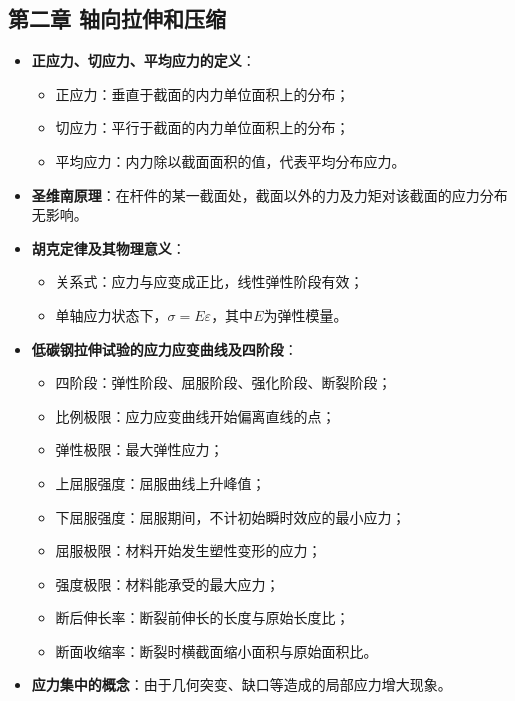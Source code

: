 \documentclass[12pt,a4paper]{article}
\begin{document}
\subsection*{第二章 轴向拉伸和压缩}
\begin{itemize}
  \item \textbf{正应力、切应力、平均应力的定义}：
    \begin{itemize}
      \item 正应力：垂直于截面的内力单位面积上的分布；
      \item 切应力：平行于截面的内力单位面积上的分布；
      \item 平均应力：内力除以截面面积的值，代表平均分布应力。
    \end{itemize}
  \item \textbf{圣维南原理}：在杆件的某一截面处，截面以外的力及力矩对该截面的应力分布无影响。
  \item \textbf{胡克定律及其物理意义}：
    \begin{itemize}
      \item 关系式：应力与应变成正比，线性弹性阶段有效；
      \item 单轴应力状态下，$\sigma = E \varepsilon$，其中$E$为弹性模量。
    \end{itemize}
  \item \textbf{低碳钢拉伸试验的应力应变曲线及四阶段}：
    \begin{itemize}
      \item 四阶段：弹性阶段、屈服阶段、强化阶段、断裂阶段；
      \item 比例极限：应力应变曲线开始偏离直线的点；
      \item 弹性极限：最大弹性应力；
      \item 上屈服强度：屈服曲线上升峰值；
      \item 下屈服强度：屈服期间，不计初始瞬时效应的最小应力；
      \item 屈服极限：材料开始发生塑性变形的应力；
      \item 强度极限：材料能承受的最大应力；
      \item 断后伸长率：断裂前伸长的长度与原始长度比；
      \item 断面收缩率：断裂时横截面缩小面积与原始面积比。
    \end{itemize}
  \item \textbf{应力集中的概念}：由于几何突变、缺口等造成的局部应力增大现象。
\end{itemize}
\end{document}
